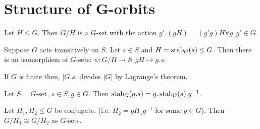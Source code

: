 \section{Structure of G-orbits}

\begin{proposition}
    Let \(H \leq G\). Then \(G / H\) is a \(G\)-set with the action \(g'.(gH) = (g'g)H \forall g, g' \in G\)
\end{proposition}

\begin{theorem}
    Suppose \(G\) acts transitively on \(S\). Let \(s \in S\) and \(H = \operatorname{stab}_G(s) \leq G\). Then there is an isomorphism of \(G\)-sets: \(\psi: G / H \to S; gH \mapsto g.s\).
\end{theorem}

\begin{corollary}
    If \(G\) is finite then, \(|G.s|\) divides \(|G|\) by Lagrange's theorem.
\end{corollary}

\begin{proposition}
    Let \(S = G\)-set, \(s \in S, g \in G\). Then \(\operatorname{stab}_G(g.s) = g.\operatorname{stab}_G(s).g^{-1}\).
\end{proposition}

\begin{corollary}
    Let \(H_1, H_2 \leq G\) be conjugate. (i.e. \(H_2 = gH_1g^{-1}\) for some \(g \in G\)). Then \(G / H_1 \cong G / H_2\) as \(G\)-sets.
\end{corollary}


